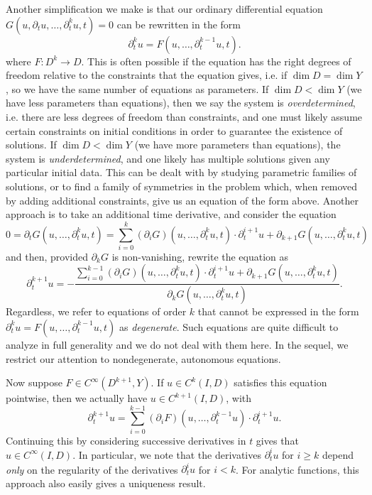 Another simplification we make is that our ordinary differential equation $G(u, \partial_t u, \dots, \partial_t^k u, t) = 0$ can be rewritten in the form
%
\[ \partial_t^k u = F(u,\dots, \partial_t^{k-1} u, t). \]
where $F: D^k \to D$. This is often possible if the equation has the right degrees of freedom relative to the constraints that the equation gives, i.e. if $\dim D = \dim Y$, so we have the same number of equations as parameters. If $\dim D < \dim Y$ (we have less parameters than equations), then we say the system is \emph{overdetermined}, i.e. there are less degrees of freedom than constraints, and one must likely assume certain constraints on initial conditions in order to guarantee the existence of solutions. If $\dim D < \dim Y$ (we have more parameters than equations), the system is \emph{underdetermined}, and one likely has multiple solutions given any particular initial data. This can be dealt with by studying parametric families of solutions, or to find a family of symmetries in the problem which, when removed by adding additional constraints, give us an equation of the form above. Another approach is to take an additional time derivative, and consider the equation
%
\[ 0 = \partial_t G(u,\dots,\partial_t^ku,t) = \sum_{i = 0}^k (\partial_i G)(u,\dots,\partial_t^k u, t) \cdot \partial_t^{i+1} u + \partial_{k+1} G(u,\dots,\partial_t^k u, t) \]
%
and then, provided $\partial_k G$ is non-vanishing, rewrite the equation as
%
\[ \partial_t^{k+1} u = - \frac{\sum_{i = 0}^{k-1} (\partial_i G)(u,\dots,\partial_t^k u, t) \cdot \partial_t^{i+1} u + \partial_{k+1} G(u,\dots,\partial_t^k u, t)}{\partial_k G(u,\dots,\partial_t^k u, t)}. \]
%
Regardless, we refer to equations of order $k$ that cannot be expressed in the form $\partial_t^k u = F(u,\dots,\partial_t^{k-1} u,t)$ as \emph{degenerate}. Such equations are quite difficult to analyze in full generality and we do not deal with them here. In the sequel, we restrict our attention to nondegenerate, autonomous equations.

Now suppose $F \in C^\infty(D^{k+1},Y)$. If $u \in C^k(I,D)$ satisfies this equation pointwise, then we actually have $u \in C^{k+1}(I,D)$, with
%
\[ \partial_t^{k+1} u = \sum_{i = 0}^{k-1} (\partial_i F)(u,\dots,\partial_t^{k-1}u) \cdot \partial_t^{i+1} u. \]
%
Continuing this by considering successive derivatives in $t$ gives that $u \in C^\infty(I,D)$. In particular, we note that the derivatives $\partial_t^i u$ for $i \geq k$ depend \emph{only} on the regularity of the derivatives $\partial_t^i u$ for $i < k$. For analytic functions, this approach also easily gives a uniqueness result.

